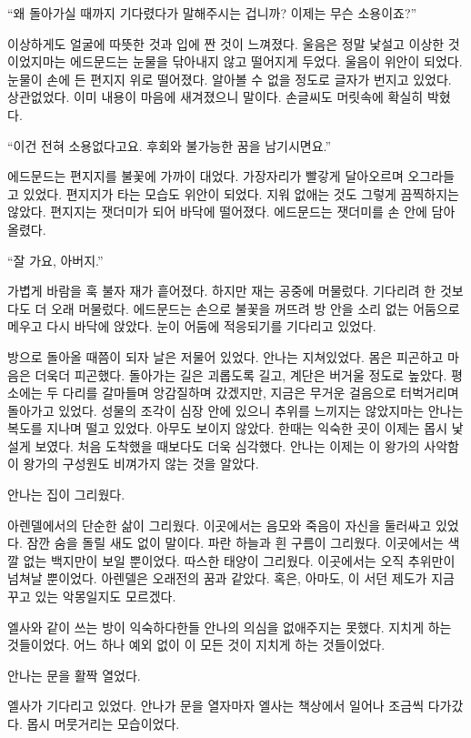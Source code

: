 ``왜 돌아가실 때까지 기다렸다가 말해주시는 겁니까? 이제는 무슨 소용이죠?''

이상하게도 얼굴에 따뜻한 것과 입에 짠 것이 느껴졌다. 울음은 정말 낯설고 이상한 것이었지마는 에드문드는 눈물을 닦아내지 않고 떨어지게 두었다. 울음이 위안이 되었다. 눈물이 손에 든 편지지 위로 떨어졌다. 알아볼 수 없을 정도로 글자가 번지고 있었다. 상관없었다. 이미 내용이 마음에 새겨졌으니 말이다. 손글씨도 머릿속에 확실히 박혔다.

``이건 전혀 소용없다고요. 후회와 불가능한 꿈을 남기시면요.''

에드문드는 편지지를 불꽃에 가까이 대었다. 가장자리가 빨갛게 달아오르며 오그라들고 있었다. 편지지가 타는 모습도 위안이 되었다. 지워 없애는 것도 그렇게 끔찍하지는 않았다. 편지지는 잿더미가 되어 바닥에 떨어졌다. 에드문드는 잿더미를 손 안에 담아 올렸다.

``잘 가요, 아버지.''

가볍게 바람을 훅 불자 재가 흩어졌다. 하지만 재는 공중에 머물렀다. 기다리려 한 것보다도 더 오래 머물렀다. 에드문드는 손으로 불꽃을 꺼뜨려 방 안을 소리 없는 어둠으로 메우고 다시 바닥에 앉았다. 눈이 어둠에 적응되기를 기다리고 있었다.

\textbreak

방으로 돌아올 때쯤이 되자 날은 저물어 있었다. 안나는 지쳐있었다. 몸은 피곤하고 마음은 더욱더 피곤했다. 돌아가는 길은 괴롭도록 길고, 계단은 버거울 정도로 높았다. 평소에는 두 다리를 갈마들며 앙감질하며 갔겠지만, 지금은 무거운 걸음으로 터벅거리며 돌아가고 있었다. 성물의 조각이 심장 안에 있으니 추위를 느끼지는 않았지마는 안나는 복도를 지나며 떨고 있었다. 아무도 보이지 않았다. 한때는 익숙한 곳이 이제는 몹시 낯설게 보였다. 처음 도착했을 때보다도 더욱 심각했다. 안나는 이제는 이 왕가의 사악함이 왕가의 구성원도 비껴가지 않는 것을 알았다.

안나는 집이 그리웠다.

아렌델에서의 단순한 삶이 그리웠다. 이곳에서는 음모와 죽음이 자신을 둘러싸고 있었다. 잠깐 숨을 돌릴 새도 없이 말이다. 파란 하늘과 흰 구름이 그리웠다. 이곳에서는 색깔 없는 백지만이 보일 뿐이었다. 따스한 태양이 그리웠다. 이곳에서는 오직 추위만이 넘쳐날 뿐이었다. 아렌델은 오래전의 꿈과 같았다. 혹은, 아마도, 이 서던 제도가 지금 꾸고 있는 악몽일지도 모르겠다.

엘사와 같이 쓰는 방이 익숙하다한들 안나의 의심을 없애주지는 못했다. 지치게 하는 것들이었다. 어느 하나 예외 없이 이 모든 것이 지치게 하는 것들이었다.

안나는 문을 활짝 열었다.

엘사가 기다리고 있었다. 안나가 문을 열자마자 엘사는 책상에서 일어나 조금씩 다가갔다. 몹시 머뭇거리는 모습이었다.

